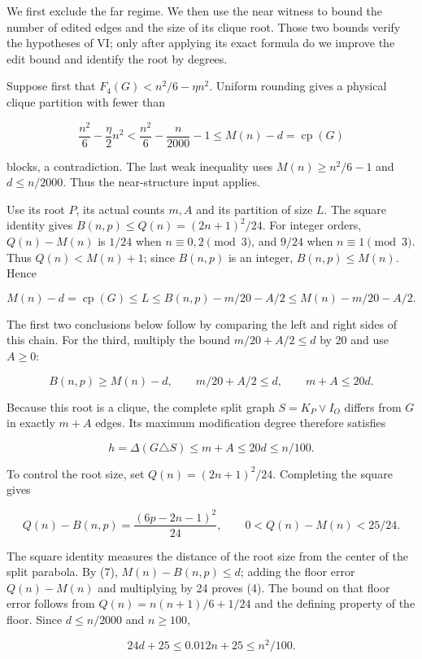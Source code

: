 \documentclass[english,11pt,a4paper]{article}
\begin{document}
We first exclude the far regime. We then use the near witness to bound
the number of edited edges and the size of its clique root. Those two
bounds verify the hypotheses of VI; only after applying its exact
formula do we improve the edit bound and identify the root by degrees.

Suppose first that \(F_4(G)<n^2/6-\eta n^2\). Uniform rounding gives a
physical clique partition with fewer than

\[
\frac{n^2}{6}-\frac\eta2n^2
<\frac{n^2}{6}-\frac n{2000}-1
\le M(n)-d=\operatorname{cp}(G)
\]

blocks, a contradiction. The last weak inequality uses
\(M(n)\ge n^2/6-1\) and \(d\le n/2000\). Thus the near-structure input
applies.

Use its root \(P\), its actual counts \(m,A\) and its partition of size
\(L\). The square identity gives \(B(n,p)\le Q(n)=(2n+1)^2/24\). For
integer orders, \(Q(n)-M(n)\) is \(1/24\) when \(n\equiv0,2\pmod3\), and
\(9/24\) when \(n\equiv1\pmod3\). Thus \(Q(n)<M(n)+1\); since \(B(n,p)\)
is an integer, \(B(n,p)\le M(n)\). Hence

\[
M(n)-d=\operatorname{cp}(G)\le L
\le B(n,p)-m/20-A/2\le M(n)-m/20-A/2.
\]

The first two conclusions below follow by comparing the left and right
sides of this chain. For the third, multiply the bound \(m/20+A/2\le d\)
by 20 and use \(A\ge0\):

\[
B(n,p)\ge M(n)-d,\qquad m/20+A/2\le d,
\qquad m+A\le20d.
\tag{7}
\]

Because this root is a clique, the complete split graph
\(S=K_P\vee I_O\) differs from \(G\) in exactly \(m+A\) edges. Its
maximum modification degree therefore satisfies

\[
h=\Delta(G\triangle S)\le m+A\le20d\le n/100.
\tag{8}
\]

To control the root size, set \(Q(n)=(2n+1)^2/24\). Completing the
square gives

\[
Q(n)-B(n,p)=\frac{(6p-2n-1)^2}{24},
\qquad 0<Q(n)-M(n)<25/24.
\]

The square identity measures the distance of the root size from the
center of the split parabola. By (7), \(M(n)-B(n,p)\le d\); adding the
floor error \(Q(n)-M(n)\) and multiplying by 24 proves (4). The bound on
that floor error follows from \(Q(n)=n(n+1)/6+1/24\) and the defining
property of the floor. Since \(d\le n/2000\) and \(n\ge100\),

\[
24d+25\le0.012n+25\le n^2/100.
\]
\end{document}
